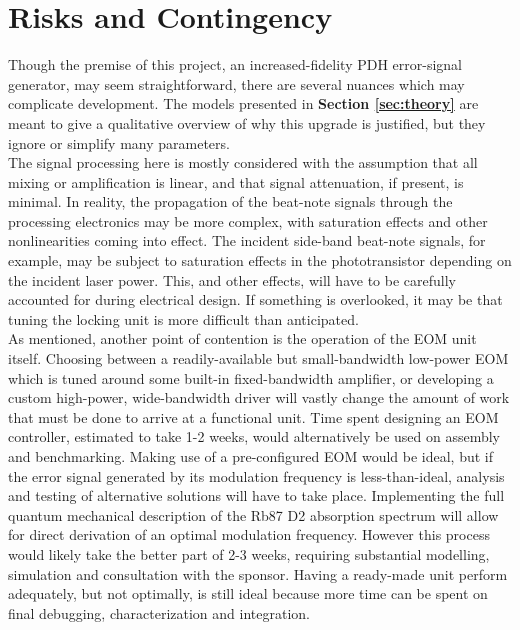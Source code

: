 \newpage
\section{Risks and Contingency}

Though the premise of this project, an increased-fidelity PDH error-signal
generator, may seem straightforward, there are several nuances which may
complicate development. The models presented in \textbf{Section
\ref{sec:theory}} are meant to give a qualitative overview of why this upgrade
is justified, but they ignore or simplify many parameters. \\

The signal processing here is mostly considered with the assumption that all
mixing or amplification is linear, and that signal attenuation, if present,
is minimal. In reality, the propagation of the beat-note signals through the
processing electronics may be more complex, with saturation effects and other
nonlinearities coming into effect. The incident side-band beat-note signals,
for example, may be subject to saturation effects in the phototransistor
depending on the incident laser power. This, and other effects, will have to be
carefully accounted for during electrical design. If something is overlooked,
it may be that tuning the locking unit is more difficult than anticipated. \\

As mentioned, another point of contention is the operation of the EOM unit
itself. Choosing between a readily-available but small-bandwidth low-power EOM
which is tuned around some built-in fixed-bandwidth amplifier, or developing
a custom high-power, wide-bandwidth driver will vastly change the amount of
work that must be done to arrive at a functional unit. Time spent designing an
EOM controller, estimated to take 1-2 weeks, would alternatively be used on
assembly and benchmarking. Making use of a pre-configured EOM would be ideal, but
if the error signal generated by its modulation frequency is less-than-ideal,
analysis and testing of alternative solutions will have to take place.
Implementing the full quantum mechanical description of the Rb87 D2 absorption
spectrum will allow for direct derivation of an optimal modulation frequency.
However this process would likely take the better part of 2-3 weeks, requiring
substantial modelling, simulation and consultation with the sponsor. Having a
ready-made unit perform adequately, but not optimally, is still ideal because
more time can be spent on final debugging, characterization and integration. \\

